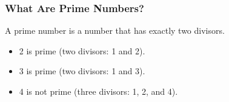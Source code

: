 \documentclass{beamer}
\begin{document}
\begin{frame}
\frametitle{What Are Prime Numbers?}
\begin{definition}
A \alert{prime number} is a number that has exactly two divisors.
\end{definition}
\begin{example}
\begin{itemize}
\item 2 is prime (two divisors: 1 and 2).
\item 3 is prime (two divisors: 1 and 3).
\item 4 is not prime (\alert{three} divisors: 1, 2, and 4).
\end{itemize}
\end{example}
\end{frame}
\end{document}
